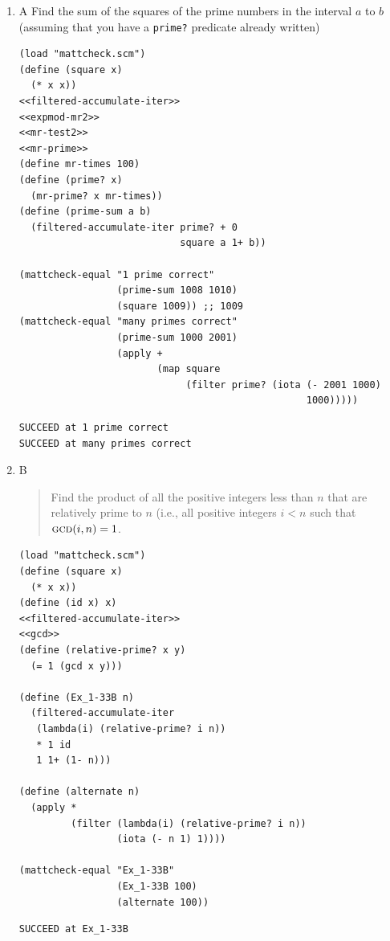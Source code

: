 \documentclass[final,fleqn,titlepage,twoside]{article}
\begin{document}
\begin{enumerate}
\item A
\label{sec:org80038d7}
Find the sum of the squares of the prime numbers in the interval \(a\) to \(b\)
(assuming that you have a \texttt{prime?} predicate already written)

\begin{verbatim}
(load "mattcheck.scm")
(define (square x)
  (* x x))
<<filtered-accumulate-iter>>
<<expmod-mr2>>
<<mr-test2>>
<<mr-prime>>
(define mr-times 100)
(define (prime? x)
  (mr-prime? x mr-times))
(define (prime-sum a b)
  (filtered-accumulate-iter prime? + 0
                            square a 1+ b))

(mattcheck-equal "1 prime correct"
                 (prime-sum 1008 1010)
                 (square 1009)) ;; 1009
(mattcheck-equal "many primes correct"
                 (prime-sum 1000 2001)
                 (apply +
                        (map square
                             (filter prime? (iota (- 2001 1000)
                                                  1000)))))
\end{verbatim}

\begin{verbatim}
SUCCEED at 1 prime correct
SUCCEED at many primes correct
\end{verbatim}

\item B
\label{sec:org424d724}
\begin{quote}
Find the product of all the positive integers less than \(n\) that are
relatively prime to \(n\) (i.e., all positive integers \(i < n\) such that
\(\textsc{gcd}(i, n) = 1\).
\end{quote}

\begin{verbatim}
(load "mattcheck.scm")
(define (square x)
  (* x x))
(define (id x) x)
<<filtered-accumulate-iter>>
<<gcd>>
(define (relative-prime? x y)
  (= 1 (gcd x y)))

(define (Ex_1-33B n)
  (filtered-accumulate-iter
   (lambda(i) (relative-prime? i n))
   * 1 id
   1 1+ (1- n)))

(define (alternate n)
  (apply *
         (filter (lambda(i) (relative-prime? i n))
                 (iota (- n 1) 1))))

(mattcheck-equal "Ex_1-33B"
                 (Ex_1-33B 100)
                 (alternate 100))
\end{verbatim}

\begin{verbatim}
SUCCEED at Ex_1-33B
\end{verbatim}
\end{enumerate}
\end{document}
